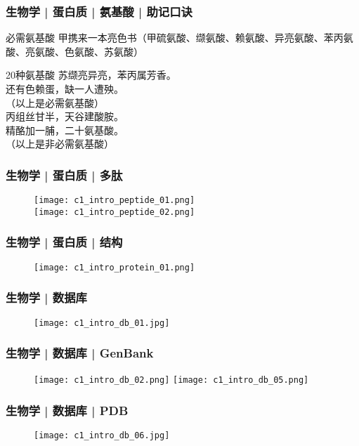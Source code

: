 \begin{frame}
  \frametitle{生物学 | 蛋白质 | 氨基酸 | 助记口诀}
  \begin{block}{必需氨基酸}
  甲携来一本亮色书（甲硫氨酸、缬氨酸、赖氨酸、异亮氨酸、苯丙氨酸、亮氨酸、色氨酸、苏氨酸）
\end{block}
\pause
\begin{block}{20种氨基酸}
  苏缬亮异亮，苯丙属芳香。\\
  还有色赖蛋，缺一人遭殃。\\
  （以上是必需氨基酸）\\
  丙组丝甘半，天谷建酸胺。\\
  精酪加一脯，二十氨基酸。\\
  （以上是非必需氨基酸）
\end{block}
\end{frame}

\begin{frame}
  \frametitle{生物学 | 蛋白质 | 多肽}
  \begin{figure}
    \centering
    \texttt{[image: c1\_intro\_peptide\_01.png]}\\
    \texttt{[image: c1\_intro\_peptide\_02.png]}
  \end{figure}
\end{frame}

\begin{frame}
  \frametitle{生物学 | 蛋白质 | 结构}
  \begin{figure}
    \centering
    \texttt{[image: c1\_intro\_protein\_01.png]}
  \end{figure}
\end{frame}

\begin{frame}
  \frametitle{生物学 | \alert{数据库}}
  \begin{figure}
    \centering
    \texttt{[image: c1\_intro\_db\_01.jpg]}
  \end{figure}
\end{frame}

\begin{frame}
  \frametitle{生物学 | 数据库 | GenBank}
  \begin{figure}
    \texttt{[image: c1\_intro\_db\_02.png]}
    \texttt{[image: c1\_intro\_db\_05.png]}
  \end{figure}
\end{frame}

\begin{frame}
  \frametitle{生物学 | 数据库 | PDB}
  \begin{figure}
    \centering
    \texttt{[image: c1\_intro\_db\_06.jpg]}
  \end{figure}
\end{frame}

